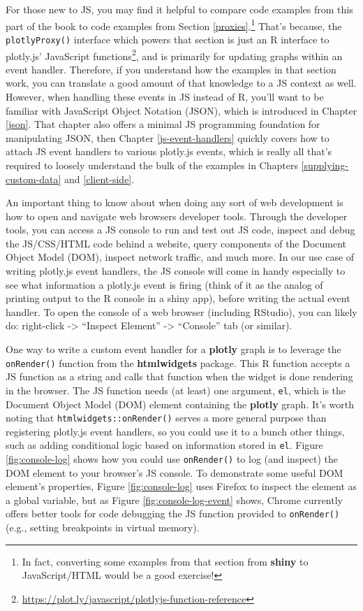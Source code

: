 \documentclass[
  12pt,
]{krantz}
\renewcommand{\href}[2]{#2\footnote{\url{#1}}}
\begin{document}
For those new to JS, you may find it helpful to compare code examples from this part of the book to code examples from Section \ref{proxies}.\footnote{In fact, converting some examples from that section from \textbf{shiny} to JavaScript/HTML would be a good exercise!} That's because, the \texttt{plotlyProxy()} interface which powers that section is just an R interface to \href{https://plot.ly/javascript/plotlyjs-function-reference}{plotly.js' JavaScript functions}, and is primarily for updating graphs within an event handler. Therefore, if you understand how the examples in that section work, you can translate a good amount of that knowledge to a JS context as well.
However, when handling these events in JS instead of R, you'll want to be familiar with JavaScript Object Notation (JSON), which is introduced in Chapter \ref{json}. That chapter also offers a minimal JS programming foundation for manipulating JSON, then Chapter \ref{js-event-handlers} quickly covers how to attach JS event handlers to various plotly.js events, which is really all that's required to loosely understand the bulk of the examples in Chapters \ref{supplying-custom-data} and \ref{client-side}.

An important thing to know about when doing any sort of web development is how to open and navigate web browsers developer tools. Through the developer tools, you can access a JS console to run and test out JS code, inspect and debug the JS/CSS/HTML code behind a website, query components of the Document Object Model (DOM), inspect network traffic, and much more. In our use case of writing plotly.js event handlers, the JS console will come in handy especially to see what information a plotly.js event is firing (think of it as the analog of printing output to the R console in a shiny app), before writing the actual event handler. To open the console of a web browser (including RStudio), you can likely do: right-click -\textgreater{} ``Inspect Element'' -\textgreater{} ``Console'' tab (or similar).

One way to write a custom event handler for a \textbf{plotly} graph is to leverage the \texttt{onRender()} function from the \textbf{htmlwidgets} package. This R function accepts a JS function as a string and calls that function when the widget is done rendering in the browser. The JS function needs (at least) one argument, \texttt{el}, which is the Document Object Model (DOM) element containing the \textbf{plotly} graph. It's worth noting that \texttt{htmlwidgets::onRender()} serves a more general purpose than registering plotly.js event handlers, so you could use it to a bunch other things, such as adding conditional logic based on information stored in \texttt{el}. Figure \ref{fig:console-log} shows how you could use \texttt{onRender()} to log (and inspect) the DOM element to your browser's JS console. To demonstrate some useful DOM element's properties, Figure \ref{fig:console-log} uses Firefox to inspect the element as a global variable, but as Figure \ref{fig:console-log-event} shows, Chrome currently offers better tools for code debugging the JS function provided to \texttt{onRender()} (e.g., setting breakpoints in virtual memory).
\end{document}
